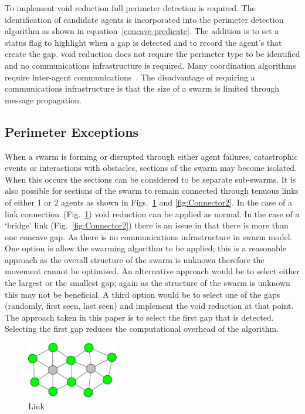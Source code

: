 \documentclass[preprint,12pt]{elsarticle}
\begin{document}
To implement void reduction full perimeter detection is required. The
identification of candidate agents is incorporated into the perimeter
detection algorithm as shown in equation~\ref{concave-predicate}. The addition is to set a status flag to highlight when a gap is detected and to record the agent's that create the gap. void reduction does not require the perimeter type to be identified and no communications infrastructure is required. Many coordination algorithms require inter-agent communications~\cite{MD:09,NIM:09,SOM:12,ZFG:13,JG:13}. The disadvantage of requiring a communications infrastructure is that the size of a swarm is limited through message propagation.

\subsection{Perimeter Exceptions}\label{concave:Exceptions}
When a swarm is forming or disrupted through either agent failures, catastrophic events or interactions with obstacles, sections of the swarm may become isolated. When this occurs the sections can be considered to be separate sub-swarms. It is also possible for sections of the swarm to remain connected through tenuous links of either 1 or 2 agents as shown in Figs.~\ref{fig:Connector1} and \ref{fig:Connector2}. In the case of a link connection~(Fig.~\ref{fig:Connector1}) void reduction can be applied as normal. In the case of a `bridge' link (Fig.~\ref{fig:Connector2}) there is an issue in that there is more than one concave gap. As there is no communications infrastructure in swarm model. One option is allow the swarming algorithm to be applied; this is a reasonable approach as the overall structure of the swarm is unknown therefore the movement cannot be optimised. An alternative approach would be to select either the largest or the smallest gap; again as the structure of the swarm is unknown this may not be beneficial. A third option would be to select one of the gaps (randomly, first seen, last seen) and implement the void reduction at that point. The approach taken in this paper is to select the first gap that is detected. Selecting the first gap reduces the computational overhead of the algorithm.

\begin{figure}
\begin{center}
\includegraphics[width=4cm]{figures/PerimeterBots4}
\end{center}
\caption{Link\label{fig:Connector1}}
\end{figure}
\end{document}
